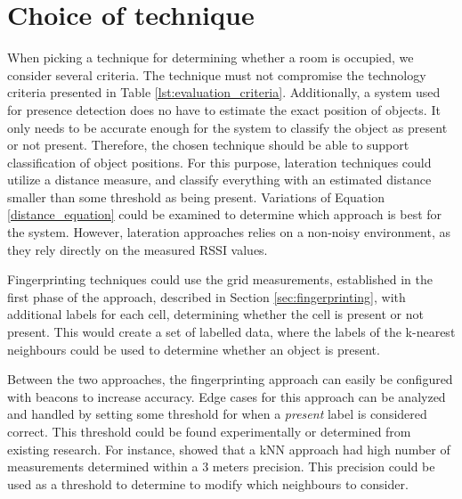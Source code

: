 \section{Choice of technique}
When picking a technique for determining whether a room is occupied, we consider several criteria.
The technique must not compromise the technology criteria presented in Table \ref{lst:evaluation_criteria}.
Additionally, a system used for presence detection does no have to estimate the exact position of objects.
It only needs to be accurate enough for the system to classify the object as present or not present.
Therefore, the chosen technique should be able to support classification of object positions.  
For this purpose, lateration techniques could utilize a distance measure, and classify everything with an estimated distance smaller than some threshold as being present.
Variations of Equation \ref{distance_equation} could be examined to determine which approach is best for the system.
However, lateration approaches relies on a non-noisy environment, as they rely directly on the measured RSSI values.

Fingerprinting techniques could use the grid measurements, established in the first phase of the approach, described in Section \ref{sec:fingerprinting}, with additional labels for each cell, determining whether the cell is present or not present.
This would create a set of labelled data, where the labels of the k-nearest neighbours could be used to determine whether an object is present. 

Between the two approaches, the fingerprinting approach can easily be configured with beacons to increase accuracy.
Edge cases for this approach can be analyzed and handled by setting some threshold for when a \textit{present} label is considered correct. 
This threshold could be found experimentally or determined from existing research. 
For instance, \citeauthor{ble_kneares_neural}\cite{ble_kneares_neural} showed that a kNN approach had high number of measurements determined within a 3 meters precision. 
This precision could be used as a threshold to determine to modify which neighbours to consider.    

